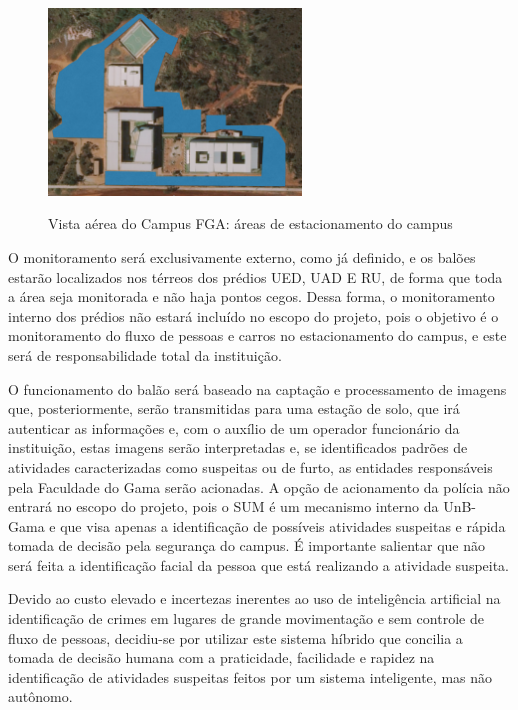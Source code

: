   \begin{figure}[htp]
  	\centering
		\caption[Vista aérea do Campus FGA:  áreas de estacionamento do campus]{Vista aérea do Campus FGA:  áreas de estacionamento do campus~\cite{mapa1}}
    \includegraphics[width=0.6\textwidth]{figuras/fga2}
	  \label{img:fga2}
  \end{figure}

  O monitoramento será exclusivamente externo, como já definido, e os balões estarão localizados nos térreos dos prédios UED, UAD E RU, de forma que toda a área seja monitorada e não haja pontos cegos. Dessa forma, o monitoramento interno dos prédios não estará incluído no escopo do projeto, pois o objetivo é o monitoramento do fluxo de pessoas e carros no estacionamento do campus, e este será de responsabilidade total da instituição.

  O funcionamento do balão será baseado na captação e processamento de imagens que, posteriormente, serão transmitidas para uma estação de solo, que irá autenticar as informações e, com o auxílio de um operador funcionário da instituição, estas imagens serão interpretadas e, se identificados padrões de atividades caracterizadas como suspeitas ou de furto, as entidades responsáveis pela Faculdade do Gama serão acionadas. A opção de acionamento da polícia não entrará no escopo do projeto, pois o SUM é um mecanismo interno da UnB-Gama e que visa apenas a identificação de possíveis atividades suspeitas e rápida tomada de decisão pela segurança do campus. É importante salientar que não será feita a identificação facial da pessoa que está realizando a atividade suspeita.

  Devido ao custo elevado e incertezas inerentes ao uso de inteligência artificial na identificação de crimes em lugares de grande movimentação e sem controle de fluxo de pessoas, decidiu-se por utilizar este sistema híbrido que concilia a tomada de decisão humana com a praticidade, facilidade e rapidez na identificação de atividades suspeitas feitos por um sistema inteligente, mas não autônomo.

